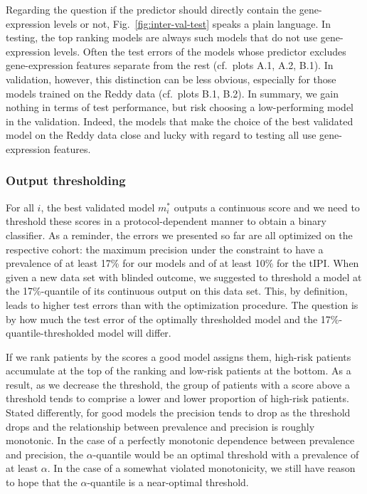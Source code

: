 Regarding the question if the predictor should directly contain the gene-expression levels or not,
Fig.\ \ref{fig:inter-val-test} speaks a plain language. In testing, the top ranking models are 
always such models that do not use gene-expression levels. Often the test errors of the models whose 
predictor excludes gene-expression features separate from the rest (cf.\ plots A.1, A.2, B.1). In 
validation, however, this distinction can be less obvious, especially for those models trained on 
the Reddy data (cf.\ plots B.1, B.2). In summary, we gain nothing in terms of test 
performance, but risk choosing a low-performing model in the validation. Indeed, the models that 
make the choice of the best validated model on the Reddy data 
close and lucky with regard to testing all use gene-expression features. 

\subsubsection{Output thresholding}




For all $i$, the best validated model $m_i^*$ outputs a continuous score and we need to threshold 
these scores in a protocol-dependent manner to obtain a binary classifier. As a reminder, the errors 
we presented so far are all optimized on the respective cohort: the maximum precision under the 
constraint to have a prevalence of at least \num{17}\% for our models and of at least \num{10}\% 
for the tIPI. When given a new data set with blinded outcome, we suggested to threshold a model at 
the \num{17}\%-quantile of its continuous output on this data set. This, by definition, leads to 
higher test errors than with the optimization procedure. The question is by how much the test error 
of the optimally thresholded model and the \num{17}\%-quantile-thresholded model will differ.

If we rank patients by the scores a good model assigns them, high-risk patients accumulate at the 
top of the ranking and low-risk patients at the bottom. As a result, as we decrease the threshold, 
the group of patients with a score above a threshold tends to comprise a lower and lower proportion 
of high-risk patients. Stated differently, for good models the precision tends to drop as the 
threshold drops and the relationship between prevalence and precision is roughly monotonic. In the 
case of a perfectly monotonic dependence between prevalence and precision, the $\alpha$-quantile 
would be an optimal threshold with a prevalence of at least $\alpha$. 
In the case of a somewhat violated monotonicity, we still have reason to hope that the 
$\alpha$-quantile is a near-optimal threshold.

